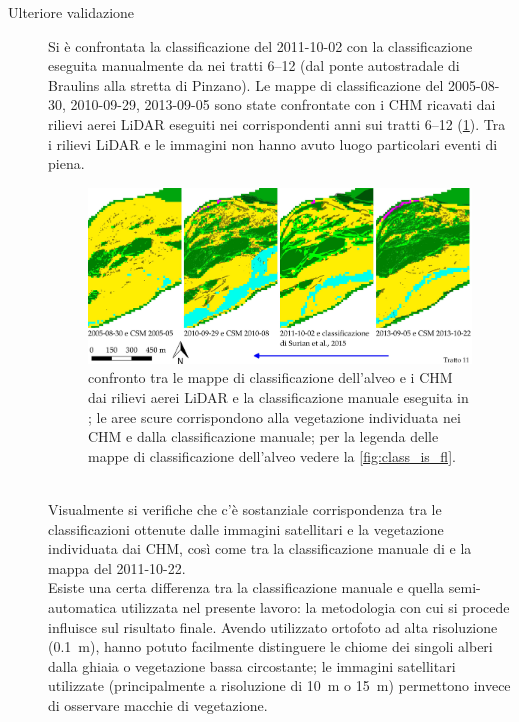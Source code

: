 \begin{description}
\begin{figure}
	\end{figure}
	\item[Ulteriore validazione] Si è confrontata la classificazione del 2011-10-02 con la classificazione eseguita manualmente da  nei tratti \numrange[range-phrase={$\div$}]{6}{12} (dal ponte autostradale di Braulins alla stretta di Pinzano).
	Le mappe di classificazione del 2005-08-30, 2010-09-29, 2013-09-05 sono state confrontate con i CHM ricavati dai rilievi aerei LiDAR eseguiti nei corrispondenti anni sui tratti \numrange[range-phrase={$\div$}]{6}{12} (\cref{fig:validazione-class-is-fl}).
	Tra i rilievi LiDAR e le immagini \AST{} non hanno avuto luogo particolari eventi di piena.
	\begin{figure}
		\centering
		\includegraphics[width=\textwidth]{files/class_mia_vs_surian_chm.jpeg}
		\caption[validazione della classificazione dell'alveo]{confronto tra le mappe di classificazione dell'alveo e i CHM dai rilievi aerei LiDAR e la classificazione manuale eseguita in ; le aree scure corrispondono alla vegetazione individuata nei CHM e dalla classificazione manuale; per la legenda delle mappe di classificazione dell'alveo vedere la \cref{fig:class_is_fl}.}
		\label{fig:validazione-class-is-fl}
	\end{figure}
	\\
	Visualmente si verifiche che c'è sostanziale corrispondenza tra le classificazioni ottenute dalle immagini satellitari e la vegetazione individuata dai CHM, così come tra la classificazione manuale di  e la mappa del 2011-10-22.
	\\
	Esiste una certa differenza tra la classificazione manuale e quella semi-automatica utilizzata nel presente lavoro: la metodologia con cui si procede influisce sul risultato finale.
	Avendo  utilizzato ortofoto ad alta risoluzione (\SI{0.1}{\m}), hanno potuto facilmente distinguere le chiome dei singoli alberi dalla ghiaia o vegetazione bassa circostante; le immagini satellitari utilizzate (principalmente a risoluzione di \SI{10}{\m} o \SI{15}{\m}) permettono invece di osservare macchie di vegetazione.

\end{description}
